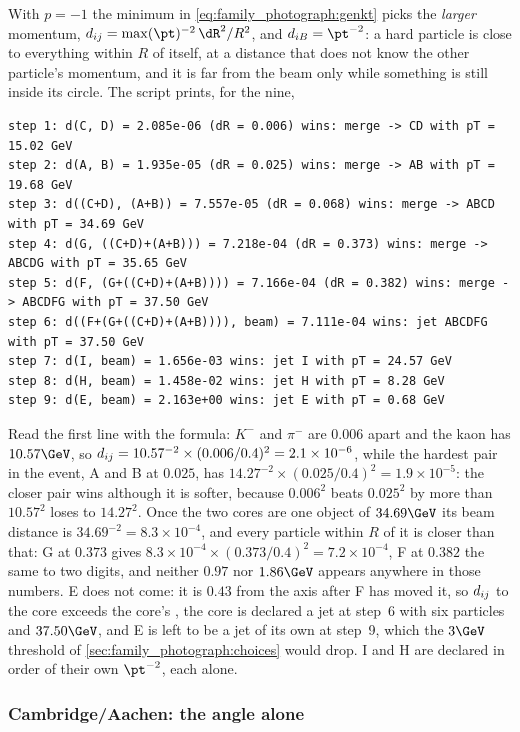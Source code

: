 With $p=-1$ the minimum in \cref{eq:family_photograph:genkt} picks the
\emph{larger} momentum, $\dij=\max(\pt)^{-2}\,\dR^2/R^2$, and
$\diB=\pt^{-2}$: a hard particle is close to everything within $R$ of
itself, at a distance that does not know the other particle's momentum,
and it is far from the beam only while something is still inside its
circle. The script prints, for the nine,
\begin{verbatim}
step 1: d(C, D) = 2.085e-06 (dR = 0.006) wins: merge -> CD with pT = 15.02 GeV
step 2: d(A, B) = 1.935e-05 (dR = 0.025) wins: merge -> AB with pT = 19.68 GeV
step 3: d((C+D), (A+B)) = 7.557e-05 (dR = 0.068) wins: merge -> ABCD with pT = 34.69 GeV
step 4: d(G, ((C+D)+(A+B))) = 7.218e-04 (dR = 0.373) wins: merge -> ABCDG with pT = 35.65 GeV
step 5: d(F, (G+((C+D)+(A+B)))) = 7.166e-04 (dR = 0.382) wins: merge -> ABCDFG with pT = 37.50 GeV
step 6: d((F+(G+((C+D)+(A+B)))), beam) = 7.111e-04 wins: jet ABCDFG with pT = 37.50 GeV
step 7: d(I, beam) = 1.656e-03 wins: jet I with pT = 24.57 GeV
step 8: d(H, beam) = 1.458e-02 wins: jet H with pT = 8.28 GeV
step 9: d(E, beam) = 2.163e+00 wins: jet E with pT = 0.68 GeV
\end{verbatim}
Read the first line with the formula: $K^-$ and $\pi^-$ are $0.006$
apart and the kaon has $10.57\GeV$, so
$d_{ij}=10.57^{-2}\times(0.006/0.4)^2=2.1\times10^{-6}$, while the hardest
pair in the event, A and B at $0.025$, has
$14.27^{-2}\times(0.025/0.4)^2=1.9\times10^{-5}$: the closer pair wins
although it is softer, because $0.006^2$ beats $0.025^2$ by more than
$10.57^2$ loses to $14.27^2$. Once the two cores are one object of
$34.69\GeV$ its beam distance is $34.69^{-2}=8.3\times10^{-4}$, and every
particle within $R$ of it is closer than that: G at $0.373$ gives
$8.3\times10^{-4}\times(0.373/0.4)^2=7.2\times10^{-4}$, F at $0.382$ the
same to two digits, and neither $0.97$ nor $1.86\GeV$ appears anywhere in
those numbers. E does not come: it is $0.43$ from the axis after F has
moved it, so $d_{ij}$ to the core exceeds the core's \diB, the core is
declared a jet at step~6 with six particles and $37.50\GeV$, and E is
left to be a jet of its own at step~9, which the $3\GeV$ threshold of
\cref{sec:family_photograph:choices} would drop. I and H are declared
in order of their own $\pt^{-2}$, each alone.

\subsubsection{Cambridge/Aachen: the angle alone}

